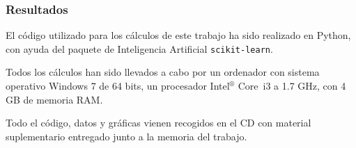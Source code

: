 \documentclass[10pt]{beamer}
\begin{document}
\begin{frame}
	\frametitle{Resultados}
	El c\'odigo utilizado para los c\'alculos de este trabajo ha sido realizado en Python, con ayuda del paquete de Inteligencia Artificial \texttt{scikit-learn}. 

	Todos los c\'alculos han sido llevados a cabo por un ordenador con sistema operativo Windows 7 de 64 bits, un procesador Intel$^\circledR$ Core\texttrademark \ i3 a 1.7 GHz, con 4 GB de memoria RAM.

Todo el c\'odigo, datos y gr\'aficas vienen recogidos en el CD con material suplementario entregado junto a la memoria del trabajo.
\end{frame}
\end{document}
